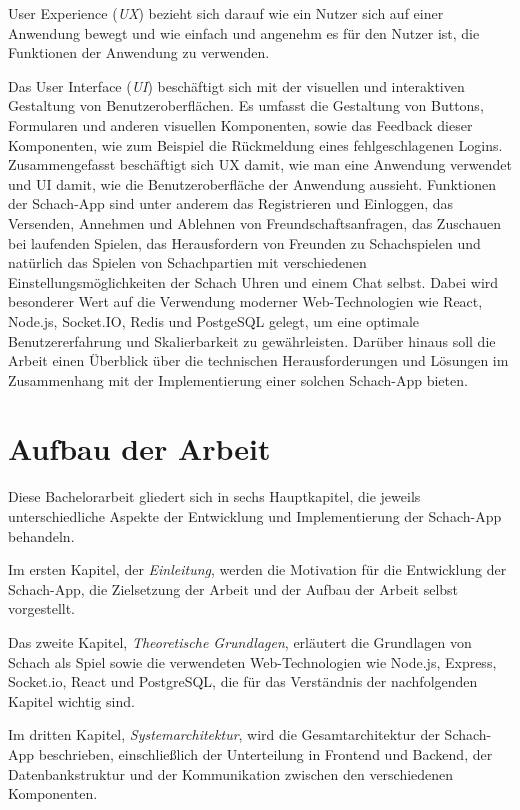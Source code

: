 \documentclass[a4paper,12pt]{report}
\newcommand{\footcite}[1]{\footnotemark\footnotetext{\cite{#1}}}
\begin{document}
    User Experience (\textit{UX}) bezieht sich darauf wie ein Nutzer sich auf einer Anwendung bewegt und wie einfach und angenehm es für den Nutzer ist, die Funktionen der Anwendung zu verwenden.
    
    Das User Interface (\textit{UI}) beschäftigt sich mit der visuellen und interaktiven Gestaltung von Benutzeroberflächen. Es umfasst die Gestaltung von Buttons, Formularen und anderen visuellen Komponenten, sowie das Feedback dieser Komponenten, wie zum Beispiel die Rückmeldung eines fehlgeschlagenen Logins.
    Zusammengefasst beschäftigt sich UX damit, wie man eine Anwendung verwendet und UI damit, wie die Benutzeroberfläche der Anwendung aussieht.\footcite{webdesign}
        Funktionen der Schach-App sind unter anderem das Registrieren und Einloggen, das Versenden, Annehmen und Ablehnen von Freundschaftsanfragen, das Zuschauen bei laufenden Spielen, das Herausfordern von Freunden zu Schachspielen und natürlich das Spielen von Schachpartien mit verschiedenen Einstellungsmöglichkeiten der Schach Uhren und einem Chat selbst.
    Dabei wird besonderer Wert auf die Verwendung moderner Web-Technologien wie React, Node.js, Socket.IO, Redis und PostgeSQL gelegt, um eine optimale Benutzererfahrung und Skalierbarkeit zu gewährleisten. Darüber hinaus soll die Arbeit einen Überblick über die technischen Herausforderungen und Lösungen im Zusammenhang mit der Implementierung einer solchen Schach-App bieten.
    
    \section{Aufbau der Arbeit}
Diese Bachelorarbeit gliedert sich in sechs Hauptkapitel, die jeweils unterschiedliche Aspekte der Entwicklung und Implementierung der Schach-App behandeln.

Im ersten Kapitel, der \textit{Einleitung}, werden die Motivation für die Entwicklung der Schach-App, die Zielsetzung der Arbeit und der Aufbau der Arbeit selbst vorgestellt.

Das zweite Kapitel, \textit{Theoretische Grundlagen}, erläutert die Grundlagen von Schach als Spiel sowie die verwendeten Web-Technologien wie Node.js, Express, Socket.io, React und PostgreSQL, die für das Verständnis der nachfolgenden Kapitel wichtig sind.

Im dritten Kapitel, \textit{Systemarchitektur}, wird die Gesamtarchitektur der Schach-App beschrieben, einschließlich der Unterteilung in Frontend und Backend, der Datenbankstruktur und der Kommunikation zwischen den verschiedenen Komponenten.
\end{document}
